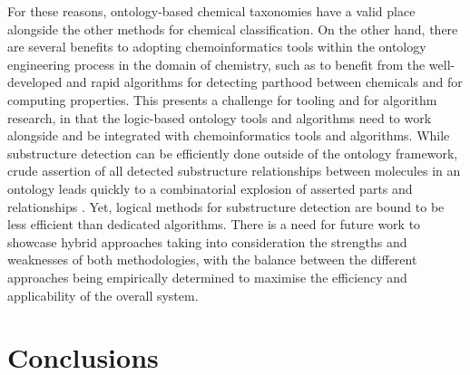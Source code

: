 \documentclass[10pt]{bmc_article}
\newenvironment{bmcformat}{\baselineskip20pt\sloppy\setboolean{publ}{false}}{\baselineskip20pt\sloppy}
\begin{document}
\begin{bmcformat}
For these reasons, ontology-based chemical taxonomies have a valid place alongside the other methods for chemical classification. On the other hand, there are several benefits to adopting chemoinformatics tools within the ontology engineering process in the domain of chemistry, such as to benefit from the well-developed and rapid algorithms for detecting parthood between chemicals and for computing properties. This presents a challenge for tooling and for algorithm research, in that the logic-based ontology tools and algorithms need to work alongside and be integrated with chemoinformatics tools and algorithms. While substructure detection can be efficiently done outside of the ontology framework, crude assertion of all detected substructure relationships between molecules in an ontology leads quickly to a combinatorial explosion of asserted parts and relationships \cite{hastingswomo2011}. Yet, logical methods for substructure detection are bound to be less efficient than dedicated algorithms. There is a need for future work to showcase hybrid approaches taking into consideration the strengths and weaknesses of both methodologies, with the balance between the different approaches being empirically determined to maximise the efficiency and applicability of the overall system.


\section*{Conclusions}


\end{bmcformat}
\end{document}
